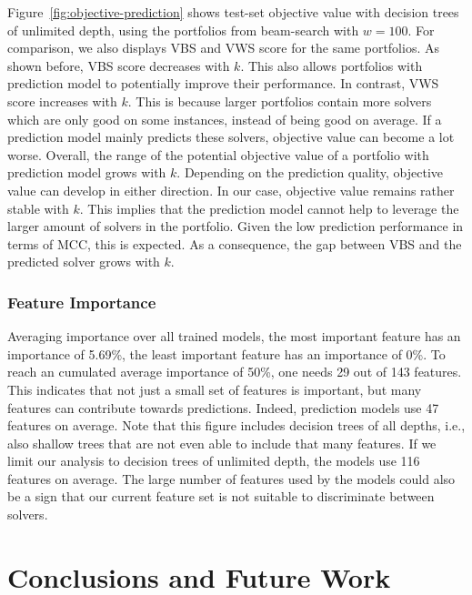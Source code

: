 \documentclass[conference]{IEEEtran}
\begin{document}
Figure~\ref{fig:objective-prediction} shows test-set objective value with decision trees of unlimited depth, using the portfolios from beam-search with $w=100$.
For comparison, we also displays VBS and VWS score for the same portfolios.
As shown before, VBS score decreases with $k$.
This also allows portfolios with prediction model to potentially improve their performance.
In contrast, VWS score increases with $k$.
This is because larger portfolios contain more solvers which are only good on some instances, instead of being good on average.
If a prediction model mainly predicts these solvers, objective value can become a lot worse.
Overall, the range of the potential objective value of a portfolio with prediction model grows with $k$.
Depending on the prediction quality, objective value can develop in either direction.
In our case, objective value remains rather stable with $k$.
This implies that the prediction model cannot help to leverage the larger amount of solvers in the portfolio.
Given the low prediction performance in terms of MCC, this is expected.
As a consequence, the gap between VBS and the predicted solver grows with $k$.

\subsubsection{Feature Importance}

Averaging importance over all trained models, the most important feature has an importance of 5.69\%, the least important feature has an importance of 0\%.
To reach an cumulated average importance of 50\%, one needs 29 out of 143 features.
This indicates that not just a small set of features is important, but many features can contribute towards predictions.
Indeed, prediction models use 47 features on average.
Note that this figure includes decision trees of all depths, i.e., also shallow trees that are not even able to include that many features.
If we limit our analysis to decision trees of unlimited depth, the models use 116 features on average.
The large number of features used by the models could also be a sign that our current feature set is not suitable to discriminate between solvers.

\section{Conclusions and Future Work}
\label{sec:conclusion}
\end{document}

